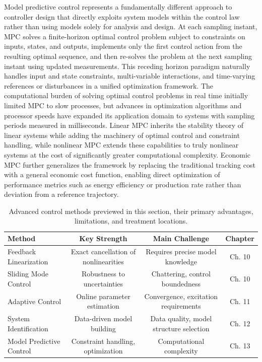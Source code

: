 Model predictive control represents a fundamentally different approach to controller design that directly exploits system models within the control law rather than using models solely for analysis and design. At each sampling instant, MPC solves a finite-horizon optimal control problem subject to constraints on inputs, states, and outputs, implements only the first control action from the resulting optimal sequence, and then re-solves the problem at the next sampling instant using updated measurements. This receding horizon paradigm naturally handles input and state constraints, multi-variable interactions, and time-varying references or disturbances in a unified optimization framework. The computational burden of solving optimal control problems in real time initially limited MPC to slow processes, but advances in optimization algorithms and processor speeds have expanded its application domain to systems with sampling periods measured in milliseconds. Linear MPC inherits the stability theory of linear systems while adding the machinery of optimal control and constraint handling, while nonlinear MPC extends these capabilities to truly nonlinear systems at the cost of significantly greater computational complexity. Economic MPC further generalizes the framework by replacing the traditional tracking cost with a general economic cost function, enabling direct optimization of performance metrics such as energy efficiency or production rate rather than deviation from a reference trajectory.

\begin{table}[h]
\centering
\begin{tabular}{|l|c|c|c|}
\hline
\textbf{Method} & \textbf{Key Strength} & \textbf{Main Challenge} & \textbf{Chapter}\\ \hline
Feedback Linearization & Exact cancellation of nonlinearities & Requires precise model knowledge & Ch. 10\\ \hline
Sliding Mode Control & Robustness to uncertainties & Chattering, control boundedness & Ch. 10\\ \hline
Adaptive Control & Online parameter estimation & Convergence, excitation requirements & Ch. 11\\ \hline
System Identification & Data-driven model building & Data quality, model structure selection & Ch. 12\\ \hline
Model Predictive Control & Constraint handling, optimization & Computational complexity & Ch. 13\\ \hline
\end{tabular}
\captionsetup{justification=centering}
\caption{Advanced control methods previewed in this section, their primary advantages, limitations, and treatment locations.}
\end{table}

